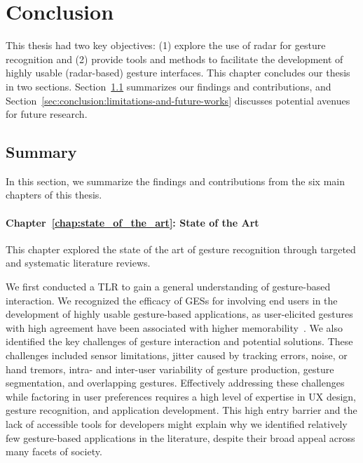 \chapter{Conclusion}
\label{chap:conclusion}
This thesis had two key objectives: (1) {explore the use of radar for gesture recognition} and (2) {provide tools and methods to facilitate the development of highly usable (radar-based) gesture interfaces}.
%
This chapter concludes our thesis in two sections.
Section~\ref{sec:conclusion:summary} summarizes our findings and contributions, and Section~\ref{sec:conclusion:limitations-and-future-works} discusses potential avenues for future research.


\section{Summary}
\label{sec:conclusion:summary}
In this section, we summarize the findings and contributions from the six main chapters of this thesis.

\subsubsection{Chapter~\ref{chap:state_of_the_art}: State of the Art}
This chapter explored the state of the art of gesture recognition through targeted and systematic literature reviews.

We first conducted a TLR to gain a general understanding of gesture-based interaction. 
%
We recognized the efficacy of GESs for involving end users in the development of highly usable gesture-based applications, as user-elicited gestures with high agreement have been associated with higher memorability~\cite{Vatavu:2014b}.
%
We also identified the key challenges of gesture interaction and potential solutions. These challenges included sensor limitations, jitter caused by tracking errors, noise, or hand tremors, intra- and inter-user variability of gesture production, gesture segmentation, and overlapping gestures. Effectively addressing these challenges while factoring in user preferences requires a high level of expertise in UX design, gesture recognition, and application development.
%
This high entry barrier and the lack of accessible tools for developers might explain why we identified relatively few gesture-based applications in the literature, despite their broad appeal across many facets of society. 

